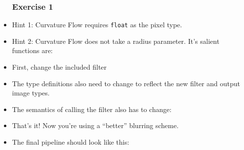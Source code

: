 \begin{frame}
\begin{itemize}
\frametitle{Exercise 1}
\item Hint 1: Curvature Flow requires {\tt float} as the pixel
  type.
\pause
\item Hint 2: Curvature Flow does not take a radius parameter. It's
  salient functions are:
\end{itemize}
\end{frame}

\begin{frame}
\begin{itemize}
\frametitle{Exercise 1 (Answer)}
\item First, change the included filter
\pause
\item The type definitions also need to change to reflect the new
  filter and output image types.
\end{itemize}
\end{frame}

\begin{frame}
\begin{itemize}
\frametitle{Exercise 1 (Answer)}
\item The semantics of calling the filter also has to change:
\pause
\item That's it! Now you're using a ``better'' blurring scheme.
\end{itemize}
\end{frame}

\begin{frame}
\begin{itemize}
\frametitle{Exercise 1 (Answer)}
\item The final pipeline should look like this:
\end{itemize}
\end{frame}
